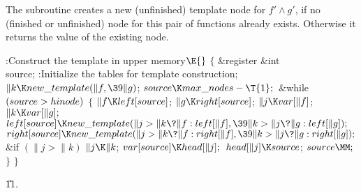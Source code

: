 The subroutine  creates a new (unfinished) template node
for $f'\land g'$, if no (finished or unfinished) node for this pair of
functions already exists. Otherwise it returns the value of the existing node.

\Y\B\4:Construct the template in upper memory\X${}\E{}$\6
${}\{{}$\1\6
\&{register} \&{int} \\{source};\7
:Initialize the tables for template construction\X;\6
${}\|k\K\\{new\_template}(\|f,\39\|g){}$;%
\6
${}\\{source}\K\\{max\_nodes}-\T{1};{}$\6
\&{while} ${}(\\{source}>\\{hinode}){}$\5
${}\{{}$\1\6
${}\|f\K\\{left}[\\{source}]{}$;\5
${}\|g\K\\{right}[\\{source}]{}$;\6
${}\|j\K\\{var}[\|f]{}$;\5
${}\|k\K\\{var}[\|g];{}$\6
${}\\{left}[\\{source}]\K\\{new\_template}(\|j>\|k\?\|f:\\{left}[\|f],\39\|k>%
\|j\?\|g:\\{left}[\|g]);{}$\6
${}\\{right}[\\{source}]\K\\{new\_template}(\|j>\|k\?\|f:\\{right}[\|f],\39\|k>%
\|j\?\|g:\\{right}[\|g]);{}$\6
\&{if} ${}(\|j>\|k){}$\1\5
${}\|j\K\|k{}$;\2\6
${}\\{var}[\\{source}]\K\\{head}[\|j];{}$\6
${}\\{head}[\|j]\K\\{source}{}$;\6
${}\\{source}\MM;{}$\6
\4${}\}{}$\2\6
\4${}\}{}$\2\par
\U11.\fi

